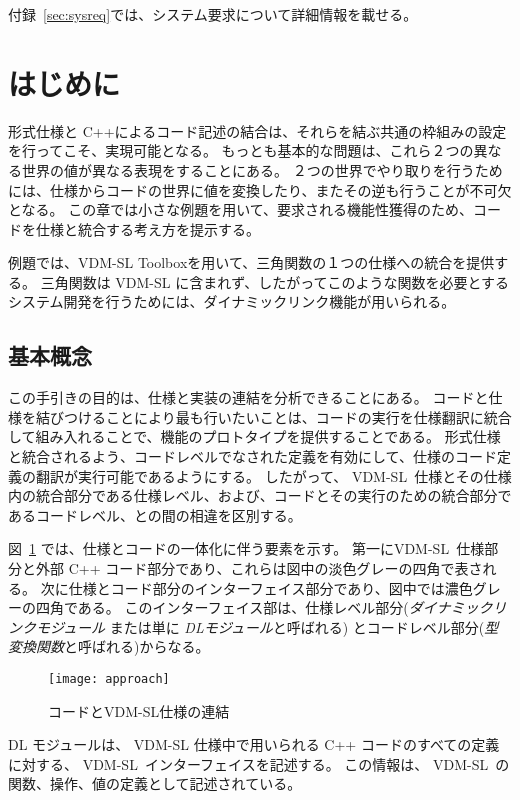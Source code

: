 \documentclass[\pformat,12pt]{jarticle}
\newcommand{\vdmslpp}{VDM-SL}
\begin{document}
付録~\ref{sec:sysreq}では、システム要求について詳細情報を載せる。


\section{はじめに}
\label{getting-started}

形式仕様と C++によるコード記述の結合は、それらを結ぶ共通の枠組みの設定を行ってこそ、実現可能となる。
もっとも基本的な問題は、これら２つの異なる世界の値が異なる表現をすることにある。
２つの世界でやり取りを行うためには、仕様からコードの世界に値を変換したり、またその逆も行うことが不可欠となる。
この章では小さな例題を用いて、要求される機能性獲得のため、コードを仕様と統合する考え方を提示する。

例題では、VDM-SL Toolboxを用いて、三角関数の１つの仕様への統合を提供する。 
三角関数は VDM-SL に含まれず、したがってこのような関数を必要とするシステム開発を行うためには、ダイナミックリンク機能が用いられる。

\subsection{基本概念}

この手引きの目的は、仕様と実装の連結を分析できることにある。 
コードと仕様を結びつけることにより最も行いたいことは、コードの実行を仕様翻訳に統合して組み入れることで、機能のプロトタイプを提供することである。
形式仕様と統合されるよう、コードレベルでなされた定義を有効にして、仕様のコード定義の翻訳が実行可能であるようにする。
したがって、 \vdmslpp\ 仕様とその仕様内の統合部分である仕様レベル、および、コードとその実行のための統合部分であるコードレベル、との間の相違を区別する。

図~\ref{idea} では、仕様とコードの一体化に伴う要素を示す。
第一に\vdmslpp\ 仕様部分と外部 C++ コード部分であり、これらは図中の淡色グレーの四角で表される。
次に仕様とコード部分のインターフェイス部分であり、図中では濃色グレーの四角である。 
このインターフェイス部は、仕様レベル部分({\em ダイナミックリンクモジュール\/} または単に {\em DLモジュール\/}と呼ばれる) とコードレベル部分({\em 型変換関数\/}と呼ばれる)からなる。

 
\begin{figure}
\begin{center}
\resizebox{.55\textwidth}{!}%
{\texttt{[image: approach]}}
\caption{コードとVDM-SL仕様の連結\label{idea}}
\end{center}
\end{figure}

DL モジュールは、 VDM-SL 仕様中で用いられる C++ コードのすべての定義に対する、 \vdmslpp\ インターフェイスを記述する。
この情報は、 \vdmslpp\ の関数、操作、値の定義として記述されている。
\end{document}
